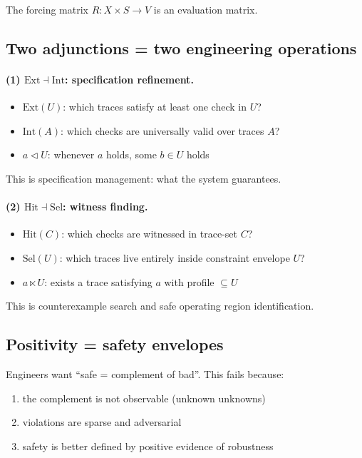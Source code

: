 \documentclass[11pt]{article}
\theoremstyle{definition}
\theoremstyle{plain}
\newcommand{\Ext}{\mathrm{Ext}}
\newcommand{\Intt}{\mathrm{Int}}
\newcommand{\Hit}{\mathrm{Hit}}
\newcommand{\Sel}{\mathrm{Sel}}
\newcommand{\ltimesrel}{\ltimes}
\newcommand{\covers}{\triangleleft}
\begin{document}
The forcing matrix $R:X\times S\to V$ is an evaluation matrix.

\subsection{Two adjunctions = two engineering operations}

\paragraph{(1) $\Ext\dashv\Intt$: specification refinement.}
\begin{itemize}
\item $\Ext(U)$: which traces satisfy at least one check in $U$?
\item $\Intt(A)$: which checks are universally valid over traces $A$?
\item $a\covers U$: whenever $a$ holds, some $b\in U$ holds
\end{itemize}
This is specification management: what the system guarantees.

\paragraph{(2) $\Hit\dashv\Sel$: witness finding.}
\begin{itemize}
\item $\Hit(C)$: which checks are witnessed in trace-set $C$?
\item $\Sel(U)$: which traces live entirely inside constraint envelope $U$?
\item $a\ltimesrel U$: exists a trace satisfying $a$ with profile $\subseteq U$
\end{itemize}
This is counterexample search and safe operating region identification.

\subsection{Positivity = safety envelopes}

Engineers want ``safe = complement of bad''. This fails because:
\begin{enumerate}[label=(\alph*)]
\item the complement is not observable (unknown unknowns)
\item violations are sparse and adversarial
\item safety is better defined by positive evidence of robustness
\end{enumerate}
\end{document}
